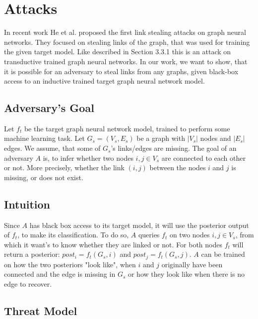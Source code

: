 \chapter{Attacks}
\label{chapter:attacks}

  In recent work He et al. \cite{DBLP:journals/corr/abs-2005-02131} proposed the first link stealing attacks on graph neural networks.
  They focused on stealing links of the graph, that was used for training the given target model.
  Like described in Section 3.3.1 this is an attack on transductive trained graph neural networks.
  In our work, we want to show, that it is possible for an adversary to steal links from any graphs, given black-box access to an inductive trained target graph neural network model.

  \section{Adversary's Goal}

    Let $f_t$ be the target graph neural network model, trained to perform some machine learning task.
    Let $G_s = (V_s, E_s)$ be a graph with $|V_s|$ nodes and $|E_s|$ edges. 
    We assume, that some of $G_s$'s links/edges are missing.
    The goal of an adversary $A$ is, to infer whether two nodes $i,j \in V_s$ are connected to each other or not.
    More precisely, whether the link $(i,j)$ between the nodes $i$ and $j$ is missing, or does not exist.
  
  \section{Intuition}

    Since $A$ has black box access to its target model, it will use the posterior output of $f_t$, to make its classification.
    To do so, $A$ queries $f_t$ on two nodes $i,j \in V_s$, from which it want's to know whether they are linked or not.
    For both nodes $f_t$ will return a posterior: $post_i = f_t(G_s, i)$ and $post_j = f_t(G_s, j)$.
    $A$ can be trained on how the two posteriors "look like", when $i$ and $j$ originally have been connected and the edge is missing in $G_s$ or how they look like when there is no edge to recover.


  \section{Threat Model}
  \label{section:threat-model}

